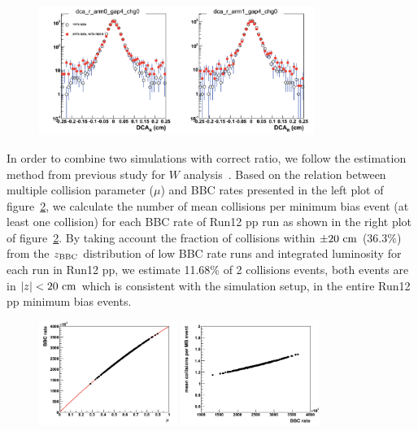 \documentclass[12pt]{article}
\begin{document}
\begin{figure}[!h]
\begin{center}
\includegraphics[width=0.8\textwidth,angle=0]{figures/dca_r_1vtx_2vtx_1miss}
\\ \caption{}
\label{fig:dca_1vtx_2vtx}
\end{center}
\end{figure}

In order to combine two simulations with correct ratio, we follow the estimation method from previous study for $W$ analysis~\cite{ref:an1103}. Based on the relation between multiple collision parameter ($\mu$) and BBC rates presented in the left plot of figure~\ref{fig:multi_collision}, we calculate the number of mean collisions per minimum bias event (at least one collision) for each BBC rate of Run12 pp run as shown in the right plot of figure~\ref{fig:multi_collision}. By taking account the fraction of collisions within $\pm20~{\rm cm}$ (36.3\%) from the $z_{\rm BBC}$ distribution of low BBC rate runs and integrated luminosity for each run in Run12 pp, we estimate 11.68\% of 2 collisions events, both events are in $|z|<20~{\rm cm}$ which is consistent with the simulation setup, in the entire Run12 pp minimum bias events.

\begin{figure}[!h]
\begin{center}
\includegraphics[width=0.4\textwidth,angle=0]{figures/multi_collision_par_BBC_rate}
\includegraphics[width=0.4\textwidth,angle=0]{figures/mean_collision_per_BBC_rate}
\\ \caption{}
\label{fig:multi_collision}
\end{center}
\end{figure}
\end{document}
